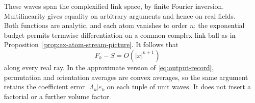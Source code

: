 These waves span the complexified link space, by finite Fourier
inversion. Multilinearity gives equality on arbitrary arguments
and hence on real fields. Both functions are analytic, and each
atom vanishes to order $n$; the exponential budget permits
termwise differentiation on a common complex link ball as in
Proposition~\ref{prop:ex-atom-stream-picture}. It follows that
\begin{equation}\label{eq:output-leading-removal}
                           F_k-S=O(|x|^{n+1})
\end{equation}
along every real ray. In the approximate version of
\eqref{eq:output-record}, permutation and orientation averages
are convex averages, so the same argument retains the coefficient
error $|\Lambda_k|\varepsilon_k$ on each tuple of unit waves.
It does not insert a factorial or a further volume factor.

